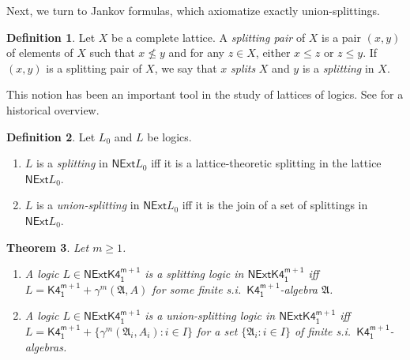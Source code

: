\documentclass[a4paper,11pt]{article}
\newtheorem{theorem}{Theorem}
\theoremstyle{definition}
\newtheorem{definition}[theorem]{Definition}
\theoremstyle{remark}
\numberwithin{theorem}{section}
\newcommand{\alg}[1]{\mathfrak{#1}}
\newcommand{\A}{\alg{A}}
\newcommand{\logic}[1]{\mathsf{#1}}
\newcommand{\Kff}[2]{\logic{K4^{#1}_{#2}}}
\newcommand{\NExt}[1]{\mathsf{NExt}{#1}}
\begin{document}
Next, we turn to Jankov formulas, which axiomatize exactly union-splittings.

\begin{definition}
    Let $X$ be a complete lattice. A \emph{splitting pair} of $X$ is a pair $(x, y)$ of elements of $X$ such that $x \not\leq y$ and for any $z \in X$, either $x \leq z$ or $z \leq y$. If $(x, y)$ is a splitting pair of $X$, we say that $x$ \emph{splits} $X$ and $y$ is a \emph{splitting} in $X$. 
\end{definition}

This notion has been an important tool in the study of lattices of logics. See \cite[Section 10.7]{czModalLogic1997} for a historical overview. 

\begin{definition} 
    Let $L_0$ and $L$ be logics.
    \begin{enumerate}
        \item $L$ is a \emph{splitting} in $\NExt{L_0}$ iff it is a lattice-theoretic splitting in the lattice $\NExt{L_0}$.
        \item $L$ is a \emph{union-splitting} in $\NExt{L_0}$ iff it is the join of a set of splittings in $\NExt{L_0}$.
    \end{enumerate}
\end{definition}


\begin{theorem}
    Let $m \geq 1$.
    \begin{enumerate}
        \item A logic $L \in \NExt{\Kff{m+1}{1}}$ is a splitting logic in $\NExt{\Kff{m+1}{1}}$ iff $L = \Kff{m+1}{1} + \gamma^m(\A, A)$ for some finite s.i.~$\Kff{m+1}{1}$-algebra $\A$.
        \item A logic $L \in \NExt{\Kff{m+1}{1}}$ is a union-splitting logic in $\NExt{\Kff{m+1}{1}}$ iff $L = \Kff{m+1}{1} + \{\gamma^m(\A_i, A_i): i \in I\}$ for a set $\{\A_i: i \in I\}$ of finite s.i.~$\Kff{m+1}{1}$-algebras.
    \end{enumerate}
\end{theorem}
\end{document}
